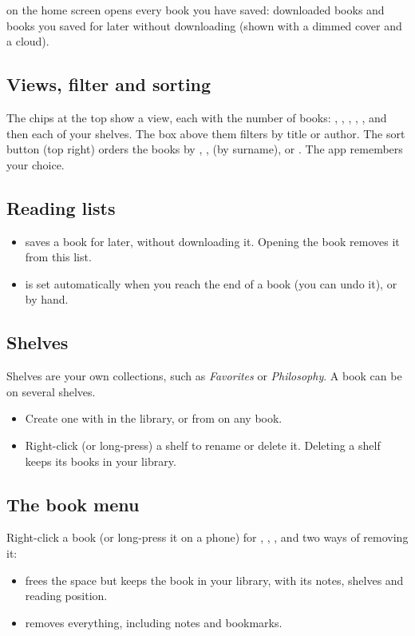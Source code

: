 \documentclass[11pt]{article}
\begin{document}
 on the home screen opens every book you have saved: downloaded books and
books you saved for later without downloading (shown with a dimmed cover and a cloud).


\subsection{Views, filter and sorting}
The chips at the top show a view, each with the number of books:
, , , , , and then each of your
shelves. The box above them filters by title or author. The sort button (top right) orders the
books by , ,  (by surname),  or
. The app remembers your choice.

\subsection{Reading lists}
\begin{itemize}
  \item {} saves a book for later, without downloading it. Opening the book removes
        it from this list.
  \item {} is set automatically when you reach the end of a book (you can undo it), or
        by hand.
\end{itemize}

\subsection{Shelves}
Shelves are your own collections, such as \emph{Favorites} or \emph{Philosophy}. A book can be on
several shelves.
\begin{itemize}
  \item Create one with  in the library, or from  on any book.
  \item Right-click (or long-press) a shelf to rename or delete it. Deleting a shelf keeps its
        books in your library.
\end{itemize}

\subsection{The book menu}
Right-click a book (or long-press it on a phone) for , ,
,  and two ways of removing it:
\begin{itemize}
  \item {} frees the space but keeps the book in your library, with its notes,
        shelves and reading position.
  \item {} removes everything, including notes and bookmarks.
\end{itemize}
\end{document}
